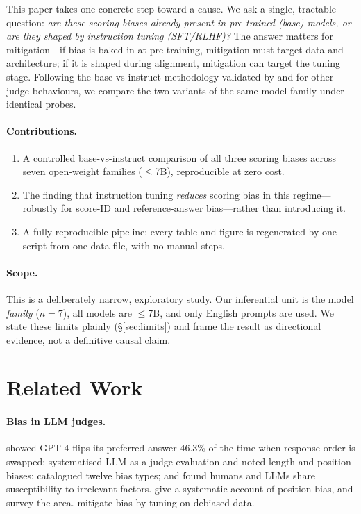 \documentclass[11pt]{article}
\begin{document}
This paper takes one concrete step toward a cause. We ask a single, tractable
question: \emph{are these scoring biases already present in pre-trained (base)
models, or are they shaped by instruction tuning (SFT/RLHF)?} The answer matters
for mitigation---if bias is baked in at pre-training, mitigation must target data
and architecture; if it is shaped during alignment, mitigation can target the
tuning stage. Following the base-vs-instruct methodology validated by
\citet{pan2025user} and \citet{thakur2024judging} for other judge behaviours, we
compare the two variants of the same model family under identical probes.

\paragraph{Contributions.}
\begin{enumerate}\itemsep2pt
  \item A controlled base-vs-instruct comparison of all three
        \citet{li2025scoring} scoring biases across seven open-weight families
        ($\leq$7B), reproducible at zero cost.
  \item The finding that instruction tuning \emph{reduces} scoring bias in this
        regime---robustly for score-ID and reference-answer bias---rather than
        introducing it.
  \item A fully reproducible pipeline: every table and figure is regenerated by
        one script from one data file, with no manual steps.
\end{enumerate}

\paragraph{Scope.} This is a deliberately narrow, exploratory study. Our
inferential unit is the model \emph{family} ($n=7$), all models are
$\leq$7B, and only English prompts are used. We state these limits plainly
(\S\ref{sec:limits}) and frame the result as directional evidence, not a
definitive causal claim.

\section{Related Work}
\paragraph{Bias in LLM judges.} \citet{wang2023large} showed GPT-4 flips its
preferred answer 46.3\% of the time when response order is swapped;
\citet{zheng2023judging} systematised LLM-as-a-judge evaluation and noted length
and position biases; \citet{ye2024justice} catalogued twelve bias types; and
\citet{chen2024humans} found humans and LLMs share susceptibility to irrelevant
factors. \citet{shi2024position} give a systematic account of position bias, and
\citet{gu2024survey} survey the area. \citet{park2024offsetbias} mitigate bias by
tuning on debiased data.
\end{document}
